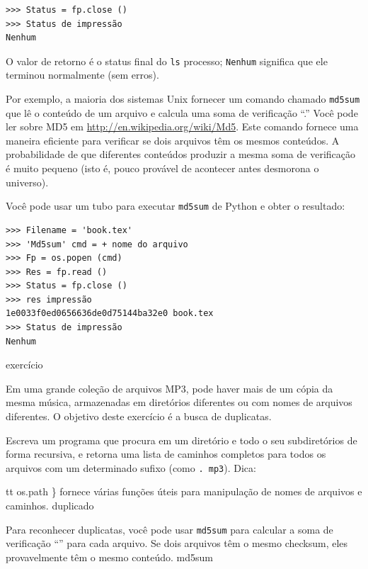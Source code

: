 \documentclass[10pt]{book}
\begin{document}
\begin{v erbatim}
\begin{verbatim}
>>> Status = fp.close ()
>>> Status de impressão
Nenhum
\end{verbatim}
%
O valor de retorno é o status final do {\tt ls} processo;
{\tt Nenhum} significa que ele terminou normalmente (sem erros).

Por exemplo, a maioria dos sistemas Unix fornecer um comando chamado {\tt md5sum}
que lê o conteúdo de um arquivo e calcula uma soma de verificação ``.''
Você pode ler sobre MD5 em \url{http://en.wikipedia.org/wiki/Md5}. Este
comando fornece uma maneira eficiente para verificar se dois arquivos
têm os mesmos conteúdos. A probabilidade de que diferentes conteúdos
produzir a mesma soma de verificação é muito pequeno (isto é, pouco provável de acontecer
antes desmorona o universo).

Você pode usar um tubo para executar {\tt md5sum} de Python e obter o resultado:

\begin{verbatim}
>>> Filename = 'book.tex'
>>> 'Md5sum' cmd = + nome do arquivo
>>> Fp = os.popen (cmd)
>>> Res = fp.read ()
>>> Status = fp.close ()
>>> res impressão
1e0033f0ed0656636de0d75144ba32e0 book.tex
>>> Status de impressão
Nenhum
\end{verbatim}


\begin{} exercício
\label{soma}

Em uma grande coleção de arquivos MP3, pode haver mais de um
cópia da mesma música, armazenadas em diretórios diferentes ou com
nomes de arquivos diferentes. O objetivo deste exercício é a busca de
duplicatas.

\begin{enumerate}

\item Escreva um programa que procura em um diretório e todo o seu
subdiretórios de forma recursiva, e retorna uma lista de caminhos completos
para todos os arquivos com um determinado sufixo (como {\tt. mp3}).
Dica: {tt os.path \} fornece várias funções úteis para
manipulação de nomes de arquivos e caminhos.
\index{} duplicado

\item Para reconhecer duplicatas, você pode usar {\tt md5sum}
para calcular a soma de verificação ``'' para cada arquivo. Se dois arquivos têm
o mesmo checksum, eles provavelmente têm o mesmo conteúdo.
\index{} md5sum

}
\end{enumerate}
\end{}
\end{v erbatim}
\end{document}
